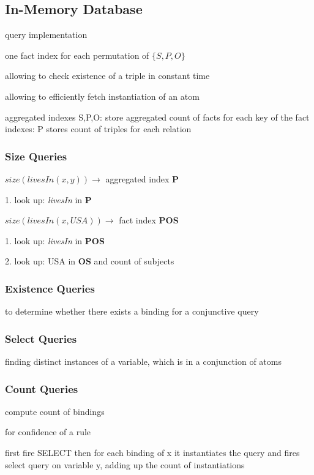 \subsection{In-Memory Database}

query implementation

one fact index for each permutation of $\{S,P,O\}$

allowing to check existence of a triple in constant time

allowing to efficiently fetch instantiation of an atom

aggregated indexes S,P,O: store aggregated count of facts for each key of the fact indexes: P stores count of triples for each relation

\subsubsection{Size Queries}

$size(livesIn(x,y))\rightarrow$ aggregated index \textbf{P}

1. look up: \textit{livesIn} in \textbf{P}

$size(livesIn(x,USA))\rightarrow$ fact index \textbf{POS}

1. look up: \textit{livesIn} in \textbf{POS}

2. look up: USA in \textbf{OS} and count of subjects

\subsubsection{Existence Queries}

to determine whether there exists a binding for a conjunctive query

\subsubsection{Select Queries}

finding distinct instances of a variable, which is in a conjunction of atoms

\subsubsection{Count Queries}

compute count of bindings

for confidence of a rule

first fire SELECT 
then for each binding of x it instantiates the query and fires select query on variable y, adding up the count of instantiations

